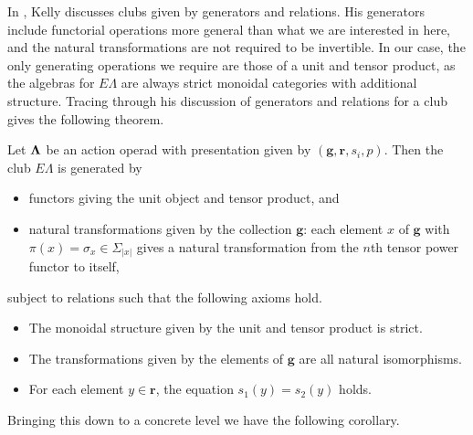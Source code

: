 In \cite{kelly_club1}, Kelly discusses clubs given by generators and relations. His generators include functorial operations more general than what we are interested in here, and the natural transformations are not required to be invertible. In our case, the only generating operations we require are those of a unit and tensor product, as the algebras for $E\Lambda$ are always strict monoidal categories with additional structure. Tracing through his discussion of generators and relations for a club gives the following theorem.

\begin{thm}\label{pres1}
Let $\mathbf{\Lambda}$ be an action operad with presentation given by $(\mathbf{g},\mathbf{r}, s_{i}, p)$. Then the club $E\Lambda$ is generated by
\begin{itemize}
  \item functors giving the unit object and tensor product, and
  \item natural transformations given by the collection $\mathbf{g}$:  each element $x$ of $\mathbf{g}$ with $\pi(x) = \sigma_{x} \in \Sigma_{|x|}$ gives a natural transformation from the $n$th tensor power functor to itself,
\end{itemize}
subject to relations such that the following axioms hold.
\begin{itemize}
  \item The monoidal structure given by the unit and tensor product is strict.
  \item The transformations given by the elements of $\mathbf{g}$ are all natural isomorphisms.
  \item For each element $y \in \mathbf{r}$, the equation $s_{1}(y) = s_{2}(y)$ holds.
\end{itemize}
\end{thm}

Bringing this down to a concrete level we have the following corollary.

